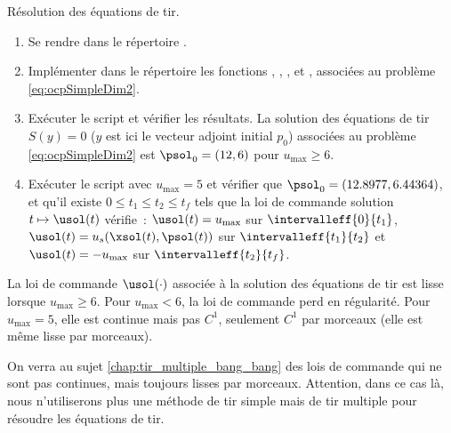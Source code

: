 \begin{myExercice} R\'esolution des \'equations de tir.
    \begin{enumerate}
        \item Se rendre dans le r\'epertoire .
        \item Impl\'ementer dans le r\'epertoire  les fonctions , , ,  et ,
            associ\'ees au probl\`eme \eqref{eq:ocpSimpleDim2}.
        \item Ex\'ecuter le script  et v\'erifier les r\'esultats. La solution des \'equations de tir $S(y) = 0$ ($y$ est ici le
            vecteur adjoint initial $p_0$) associ\'ees au probl\`eme \eqref{eq:ocpSimpleDim2} est $\psol_0 = (12, 6)$ pour $u_\mathrm{max} \ge 6$.
        \item Ex\'ecuter le script  avec $u_\mathrm{max} = 5$ et v\'erifier que $\psol_0 = (12.8977, 6.44364)$, et qu'il existe
            $0 \le t_1 \le t_2 \le t_f$ tels que la loi de commande solution $t \mapsto \usol(t)$ v\'erifie~:
            $\usol(t) = u_\mathrm{max}$ sur $\intervalleff{0}{t_1}$,
            $\usol(t) = u_s(\xsol(t),\psol(t))$ sur $\intervalleff{t_1}{t_2}$ et
            $\usol(t) = -u_\mathrm{max}$ sur $\intervalleff{t_2}{t_f}$.
    \end{enumerate}
\end{myExercice}

\begin{myremark}
    \anoter
    La loi de commande $\usol(\cdot)$ associ\'ee \`a la solution des \'equations de tir est lisse lorsque $u_\mathrm{max} \ge 6$.
    Pour $u_\mathrm{max} < 6$, la loi de commande perd en r\'egularit\'e. Pour $u_\mathrm{max} = 5$, elle est continue mais pas $C^1$,
    seulement $C^1$ par morceaux (elle est m\^eme lisse par morceaux).
\end{myremark}

\begin{myremark}
    \anoter
    On verra au sujet \ref{chap:tir_multiple_bang_bang} des lois de commande qui ne sont pas continues, mais toujours lisses par morceaux.
    Attention, dans ce cas l\`a, nous n'utiliserons plus une m\'ethode de tir simple mais de tir multiple pour r\'esoudre les \'equations de tir.
\end{myremark}

